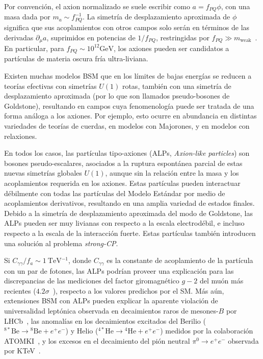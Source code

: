 Por convención, el axion normalizado se suele escribir como $a = f_{PQ} \phi$, con una masa dada por $m_a \sim f_{PQ}^{-1}$. La simetría de desplazamiento aproximada de $\phi$ significa que sus acoplamientos con otros campos solo serán en términos de las derivadas $\partial_\mu a$, suprimidos en potencias de $1/f_{PQ}$, restringidas por $f_{PQ} \gg m_{\text{weak}}$~\cite{Powell2016}. En particular, para $f_{PQ} \sim 10^{12} \si{\GeV}$, los axiones pueden ser candidatos a partículas de materia oscura fría ultra-liviana.

Existen muchas modelos BSM que en los límites de bajas energías se reducen a teorías efectivas con simetrías $U(1)$ rotas, también con una simetría de desplazamiento aproximada (por lo que son llamados pseudo-bosones de Goldstone), resultando en campos cuya fenomenología puede ser tratada de una forma análoga a los axiones. Por ejemplo, esto ocurre en abundancia en distintas variedades de teorías de cuerdas, en modelos con Majorones, y en modelos con relaxiones.

En todos los casos, las partículas tipo-axiones (ALPs, \textit{Axion-like particles}) son bosones pseudo-escalares, asociados a la ruptura espontánea parcial de estas nuevas simetrías globales $U(1)$, aunque sin la relación entre la masa y los acoplamientos requerida en los axiones. Estas partículas pueden interactuar débilmente con todas las partículas del Modelo Estándar por medio de acoplamientos derivativos, resultando en una amplia variedad de estados finales. Debido a la simetría de desplazamiento aproximada del modo de Goldstone, las ALPs pueden ser muy livianas con respecto a la escala electrodébil, e incluso respecto a la escala de la interacción fuerte. Estas partículas también introducen una solución al problema \textit{strong-CP}. 

Si $C_{\gamma\gamma}/f_a \sim \SI{1}{\TeV^{-1}}$, donde $C_{\gamma\gamma}$ es la constante de acoplamiento de la partícula con un par de fotones, las ALPs podrían proveer una explicación para las discrepancias de las mediciones del factor giromagnético $g-2$ del muón más recientes ($4.2\sigma$~\cite[-9em][]{TheMuong-2Collaboration2021}), respecto a los valores predichos por el SM. Más aún, extensiones BSM con ALPs pueden explicar la aparente violación de universalidad leptónica observada en decaimientos raros de mesones-$B$ por LHCb~\cites[-9em][]{TheLHCbcollaboration2017}[-5em][]{TheLHCbCollaboration2019}[-1em][]{TheLHCbCollaboration2021}, las anomalías en los decaimientos excitados del Berilio (${}^{8*}\text{Be} \to {}^8\text{Be} + e^+ e^-$) y Helio (${}^{4*}\text{He} \to {}^4\text{He} + e^+ e^-$) medidos por la colaboración ATOMKI~\cites[7.5em][]{Krasznahorkay2018}{Krasznahorkay:2019lyl}, y los excesos en el decaimiento del pión neutral $\pi^0 \to e^+ e^-$ observada por KTeV~\cite{Abouzaid2007}.

